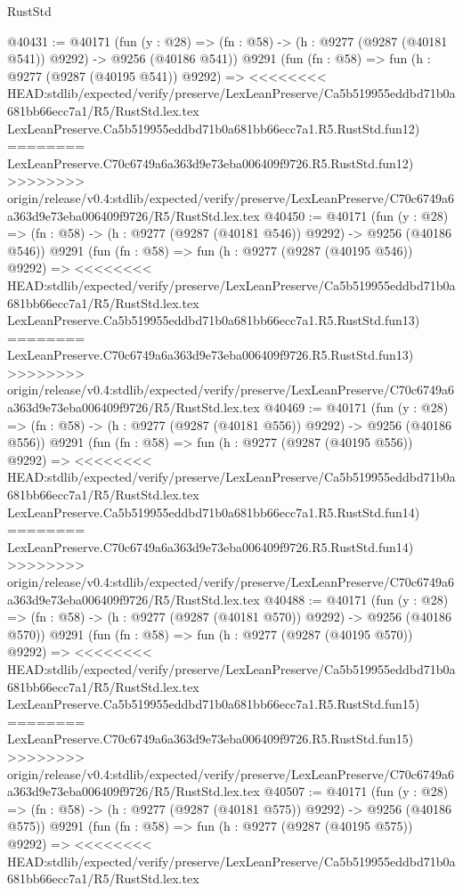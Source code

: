 \begin{lexlean}{RustStd}
\begin{coremodule}
{\begin{coremodule}
{{{{{{{{{{{{{{{{{{{{{{{{{{{{{{{{{{{{{{{{{{{{{{{{{{{{{{{@40431 := @40171
    (fun (y : @28) => (fn : @58) -> (h : @9277 (@9287 (@40181 @541)) @9292) -> @9256 (@40186 @541))
    @9291
    (fun (fn : @58) =>
    fun (h : @9277 (@9287 (@40195 @541)) @9292) =>
<<<<<<<< HEAD:stdlib/expected/verify/preserve/LexLeanPreserve/Ca5b519955eddbd71b0a681bb66ecc7a1/R5/RustStd.lex.tex
    LexLeanPreserve.Ca5b519955eddbd71b0a681bb66ecc7a1.R5.RustStd.fun12)
========
    LexLeanPreserve.C70c6749a6a363d9e73eba006409f9726.R5.RustStd.fun12)
>>>>>>>> origin/release/v0.4:stdlib/expected/verify/preserve/LexLeanPreserve/C70c6749a6a363d9e73eba006409f9726/R5/RustStd.lex.tex
@40450 := @40171
    (fun (y : @28) => (fn : @58) -> (h : @9277 (@9287 (@40181 @546)) @9292) -> @9256 (@40186 @546))
    @9291
    (fun (fn : @58) =>
    fun (h : @9277 (@9287 (@40195 @546)) @9292) =>
<<<<<<<< HEAD:stdlib/expected/verify/preserve/LexLeanPreserve/Ca5b519955eddbd71b0a681bb66ecc7a1/R5/RustStd.lex.tex
    LexLeanPreserve.Ca5b519955eddbd71b0a681bb66ecc7a1.R5.RustStd.fun13)
========
    LexLeanPreserve.C70c6749a6a363d9e73eba006409f9726.R5.RustStd.fun13)
>>>>>>>> origin/release/v0.4:stdlib/expected/verify/preserve/LexLeanPreserve/C70c6749a6a363d9e73eba006409f9726/R5/RustStd.lex.tex
@40469 := @40171
    (fun (y : @28) => (fn : @58) -> (h : @9277 (@9287 (@40181 @556)) @9292) -> @9256 (@40186 @556))
    @9291
    (fun (fn : @58) =>
    fun (h : @9277 (@9287 (@40195 @556)) @9292) =>
<<<<<<<< HEAD:stdlib/expected/verify/preserve/LexLeanPreserve/Ca5b519955eddbd71b0a681bb66ecc7a1/R5/RustStd.lex.tex
    LexLeanPreserve.Ca5b519955eddbd71b0a681bb66ecc7a1.R5.RustStd.fun14)
========
    LexLeanPreserve.C70c6749a6a363d9e73eba006409f9726.R5.RustStd.fun14)
>>>>>>>> origin/release/v0.4:stdlib/expected/verify/preserve/LexLeanPreserve/C70c6749a6a363d9e73eba006409f9726/R5/RustStd.lex.tex
@40488 := @40171
    (fun (y : @28) => (fn : @58) -> (h : @9277 (@9287 (@40181 @570)) @9292) -> @9256 (@40186 @570))
    @9291
    (fun (fn : @58) =>
    fun (h : @9277 (@9287 (@40195 @570)) @9292) =>
<<<<<<<< HEAD:stdlib/expected/verify/preserve/LexLeanPreserve/Ca5b519955eddbd71b0a681bb66ecc7a1/R5/RustStd.lex.tex
    LexLeanPreserve.Ca5b519955eddbd71b0a681bb66ecc7a1.R5.RustStd.fun15)
========
    LexLeanPreserve.C70c6749a6a363d9e73eba006409f9726.R5.RustStd.fun15)
>>>>>>>> origin/release/v0.4:stdlib/expected/verify/preserve/LexLeanPreserve/C70c6749a6a363d9e73eba006409f9726/R5/RustStd.lex.tex
@40507 := @40171
    (fun (y : @28) => (fn : @58) -> (h : @9277 (@9287 (@40181 @575)) @9292) -> @9256 (@40186 @575))
    @9291
    (fun (fn : @58) =>
    fun (h : @9277 (@9287 (@40195 @575)) @9292) =>
<<<<<<<< HEAD:stdlib/expected/verify/preserve/LexLeanPreserve/Ca5b519955eddbd71b0a681bb66ecc7a1/R5/RustStd.lex.tex
}}}}}}}}}}}}}}}}}}}}}}}}}}}}}}}}}}}}}}}}}}}}}}}}}}}}}}}
\end{coremodule}}
\end{coremodule}
\end{lexlean}
